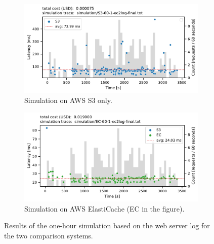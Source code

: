 \begin{figure}[t]
    \centering
    \begin{subfigure}{.78\textwidth}
        \includegraphics[width=\linewidth]{figures/S3-60-1-ec2log-final.pdf}
        \caption{Simulation on AWS S3 only.}
        \label{fig:ec2log_s3}
    \end{subfigure}
    \begin{subfigure}{.78\textwidth}
        \includegraphics[width=\linewidth]{figures/EC-60-1-ec2log-final.pdf}
        \caption{Simulation on AWS ElastiCache (EC in the figure).}
        \label{fig:ec2log_ec}
    \end{subfigure}
    \caption{Results of the one-hour simulation based on the web server log for the two comparison systems.}
    \label{fig:comparison_systems}
\end{figure}

